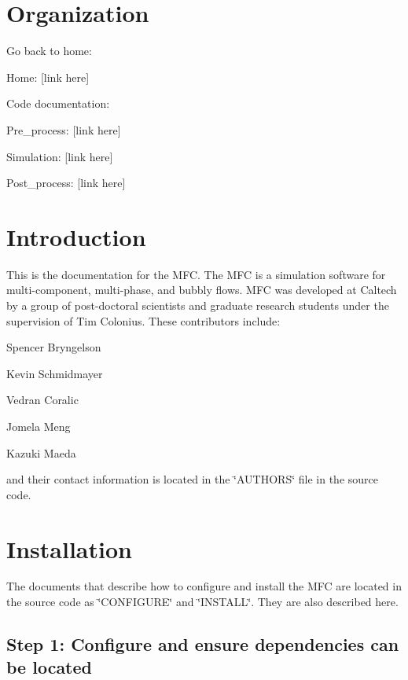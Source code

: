 \hypertarget{index_org}{}\section{Organization}\label{index_org}
Go back to home\+: \begin{DoxyItemize}
\item Home\+: \mbox{[}link here\mbox{]}\end{DoxyItemize}
Code documentation\+: \begin{DoxyItemize}
\item Pre\+\_\+process\+: \mbox{[}link here\mbox{]} \item Simulation\+: \mbox{[}link here\mbox{]} \item Post\+\_\+process\+: \mbox{[}link here\mbox{]}\end{DoxyItemize}
\hypertarget{index_intro_sec}{}\section{Introduction}\label{index_intro_sec}
This is the documentation for the M\+FC. The M\+FC is a simulation software for multi-\/component, multi-\/phase, and bubbly flows. M\+FC was developed at Caltech by a group of post-\/doctoral scientists and graduate research students under the supervision of Tim Colonius. These contributors include\+: \begin{DoxyItemize}
\item Spencer Bryngelson \item Kevin Schmidmayer \item Vedran Coralic \item Jomela Meng \item Kazuki Maeda\end{DoxyItemize}
and their contact information is located in the \char`\"{}\+A\+U\+T\+H\+O\+R\+S\char`\"{} file in the source code.\hypertarget{index_install_sec}{}\section{Installation}\label{index_install_sec}
The documents that describe how to configure and install the M\+FC are located in the source code as \char`\"{}\+C\+O\+N\+F\+I\+G\+U\+R\+E\char`\"{} and \char`\"{}\+I\+N\+S\+T\+A\+L\+L\char`\"{}. They are also described here.\hypertarget{index_step1}{}\subsection{Step 1\+: Configure and ensure dependencies can be located}\label{index_step1}
